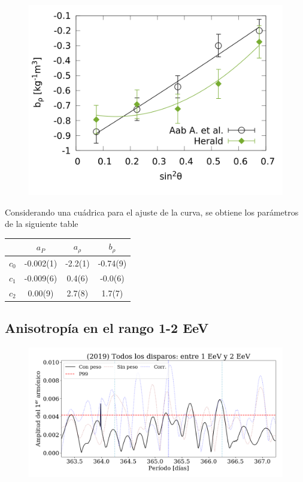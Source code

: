 \begin{figure}[H]
	\centering
	\includegraphics[width=\linewidth]{brho.png}
\end{figure}




Considerando una cuádrica para el ajuste de la curva, se obtiene los parámetros de la siguiente table
\begin{table}[H]
\centering
\begin{tabular}{c|c|c|c}
		 	& $a_P$ 	&  $a_\rho$  & $ b_\rho$ \\ \hline
$c_0$ 		& -0.002(1) & 	-2.2(1)	 &	-0.74(9)\\ \hline
$c_1$ 		& -0.009(6)	& 	 0.4(6)	 &	-0.0(6)\\ \hline
$c_2$ 		&  0.00(9) 	& 	 2.7(8)  &	 1.7(7)\\ \hline
\end{tabular}
\end{table}


\subsection{Anisotropía en el rango 1-2 EeV}

\begin{figure}[htbp]
	\centering
	\includegraphics[width=\linewidth]{ani_corr.png}
\end{figure}






